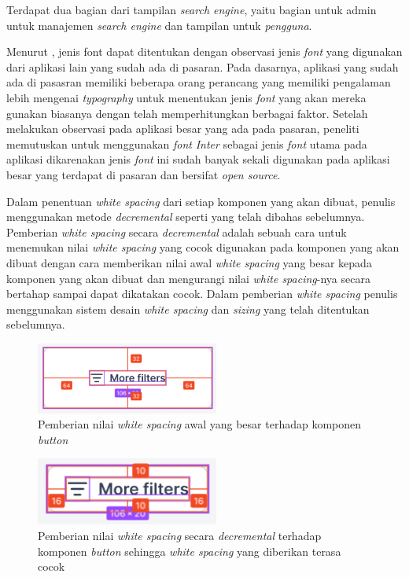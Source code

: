 \begin{enumerate}[label=\alph*)., leftmargin=1\parindent]
	Terdapat dua bagian dari tampilan \textit{search engine}, yaitu bagian untuk admin untuk manajemen \textit{search engine} dan tampilan untuk \textit{pengguna}.
	
	Menurut \citep{refactoringui}, jenis font dapat ditentukan dengan observasi jenis \textit{font} yang digunakan dari aplikasi lain yang sudah ada di pasaran. Pada dasarnya, aplikasi yang sudah ada di pasasran memiliki beberapa orang perancang yang memiliki pengalaman lebih mengenai \textit{typography} untuk menentukan jenis \textit{font} yang akan mereka gunakan biasanya dengan telah memperhitungkan berbagai faktor. Setelah melakukan observasi pada aplikasi besar yang ada pada pasaran, peneliti memutuskan untuk menggunakan \textit{font} \textit{Inter} sebagai jenis \textit{font} utama pada aplikasi dikarenakan jenis \textit{font} ini sudah banyak sekali digunakan pada aplikasi besar yang terdapat di pasaran dan bersifat \textit{open source}.
	
	Dalam penentuan \textit{white spacing} dari setiap komponen yang akan dibuat, penulis menggunakan metode \textit{decremental} seperti yang telah dibahas sebelumnya. Pemberian \textit{white spacing} secara \textit{decremental} adalah sebuah cara untuk menemukan nilai \textit{white spacing} yang cocok digunakan pada komponen yang akan dibuat dengan cara memberikan nilai awal \textit{white spacing} yang besar kepada komponen yang akan dibuat dan mengurangi nilai \textit{white spacing}-nya secara bertahap sampai dapat dikatakan cocok. Dalam pemberian \textit{white spacing} penulis menggunakan sistem desain \textit{white spacing} dan \textit{sizing} yang telah ditentukan sebelumnya.
	
	
	\begin{figure}[H]
		\centering
		\includegraphics[keepaspectratio, width=6cm]{gambar/example-whitespace-decremental-1.png}
		\caption{Pemberian nilai \textit{white spacing} awal yang besar terhadap komponen \textit{button}}
		\label{gambar:example-whitespace-decremental-1.png}
	\end{figure}
	
	
	\begin{figure}[H]
		\centering
		\includegraphics[keepaspectratio, width=6cm]{gambar/example-whitespace-decremental-2.png}
		\caption{Pemberian nilai \textit{white spacing} secara \textit{decremental} terhadap komponen \textit{button} sehingga \textit{white spacing} yang diberikan terasa cocok}
		\label{gambar:example-whitespace-decremental-2.png}
	\end{figure}


\end{enumerate}
